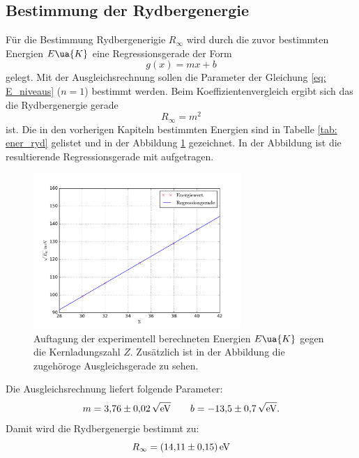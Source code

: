 \subsection{Bestimmung der Rydbergenergie}
Für die Bestimmung Rydbergenerigie $R_\infty$ wird durch die zuvor
bestimmten Energien $E\ua{K}$ eine Regressionsgerade der Form
\begin{equation*}
  g(x)=mx+b
\end{equation*}
gelegt. Mit der Ausgleichsrechnung sollen die Parameter der Gleichung \eqref{eq: E_niveaus} ($n=1$)
bestimmt werden. Beim Koeffizientenvergleich ergibt sich das die Rydbergenergie
gerade
\begin{equation*}
  R_\infty=m^2
\end{equation*}
ist.
Die in den vorherigen Kapiteln bestimmten Energien sind in Tabelle \ref{tab: ener_ryd} gelistet
und in der Abbildung \ref{fig: ryd_ener} gezeichnet. In der Abbildung ist
die resultierende Regressionsgerade mit aufgetragen.

\begin{figure}
  \centering
  \includegraphics[width=0.7\textwidth]{../Messdaten/energie_z.pdf}
  \caption{Auftagung der experimentell berechneten Energien $E\ua{K}$ gegen die Kernladungszahl $Z$. Zusätzlich ist in der Abbildung die zugehöroge Ausgleichsgerade zu sehen.}
  \label{fig: ryd_ener}
\end{figure}
Die Ausgleichsrechnung liefert folgende Parameter:
\begin{equation*}
m=\num{3.76\pm0.02}\,\sqrt{\si{\eV}} \qquad b=\num{-13.5\pm0.7}\,\sqrt{\si{\eV}}.
\end{equation*}
Damit wird die Rydbergenergie bestimmt zu:
\begin{equation}
  R_\infty=\SI{14.11\pm0.15}{\eV}
\end{equation}
\FloatBarrier
